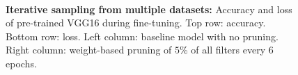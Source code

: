 \documentclass{article}
\begin{document}
\begin{figure}[!t]
	\centering
	\\[-5mm]
	\caption{\textbf{Iterative sampling from multiple datasets:} Accuracy and loss of pre-trained VGG16 during fine-tuning. Top row: accuracy. Bottom row: loss. Left column: baseline model with no pruning. Right column: weight-based pruning of $5$\% of all filters every $6$ epochs.}
	\label{pruneFiltersIntersectionMultiple}
\end{figure}
\end{document}
